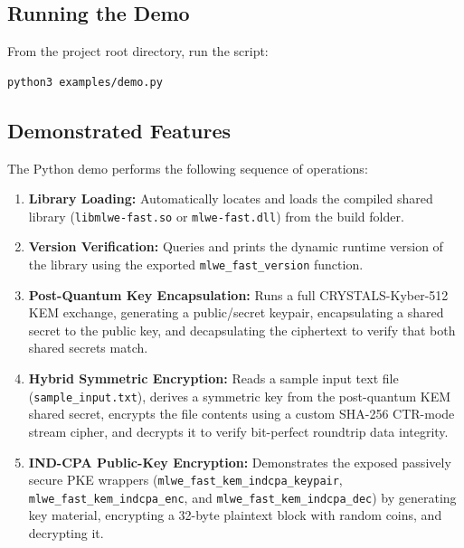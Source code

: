 \documentclass[12pt,a4paper]{article}
\begin{document}
\subsection{Running the Demo}
From the project root directory, run the script:

\begin{lstlisting}
python3 examples/demo.py
\end{lstlisting}

\subsection{Demonstrated Features}
The Python demo performs the following sequence of operations:
\begin{enumerate}
    \item \textbf{Library Loading:} Automatically locates and loads the compiled shared library (\texttt{libmlwe-fast.so} or \texttt{mlwe-fast.dll}) from the build folder.
    \item \textbf{Version Verification:} Queries and prints the dynamic runtime version of the library using the exported \texttt{mlwe\_fast\_version} function.
    \item \textbf{Post-Quantum Key Encapsulation:} Runs a full CRYSTALS-Kyber-512 KEM exchange, generating a public/secret keypair, encapsulating a shared secret to the public key, and decapsulating the ciphertext to verify that both shared secrets match.
    \item \textbf{Hybrid Symmetric Encryption:} Reads a sample input text file (\texttt{sample\_input.txt}), derives a symmetric key from the post-quantum KEM shared secret, encrypts the file contents using a custom SHA-256 CTR-mode stream cipher, and decrypts it to verify bit-perfect roundtrip data integrity.
    \item \textbf{IND-CPA Public-Key Encryption:} Demonstrates the exposed passively secure PKE wrappers (\texttt{mlwe\_fast\_kem\_indcpa\_keypair}, \texttt{mlwe\_fast\_kem\_indcpa\_enc}, and \texttt{mlwe\_fast\_kem\_indcpa\_dec}) by generating key material, encrypting a 32-byte plaintext block with random coins, and decrypting it.
\end{enumerate}
\end{document}
